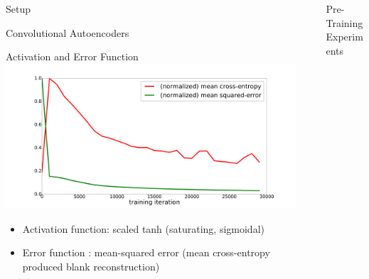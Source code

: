 \documentclass[final]{beamer}
\newlength{\sepwid}
\newlength{\onecolwid}
\newlength{\threecolwid}
\begin{document}
\begin{frame}[t]
\begin{columns}[t]
\begin{column}{\onecolwid}
\begin{alertblock}{Setup}
\begin{block}{Convolutional Autoencoders}
\end{block}

\begin{block}{Activation and Error Function}
	\centering
	\includegraphics[width=.7\linewidth]{graphics/mse_ce_comparison.png}

	\begin{itemize}
		\item Activation function: scaled tanh (saturating, sigmoidal)
		\item Error function     : mean-squared error (mean cross-entropy produced blank reconstruction)
	\end{itemize}

\end{block}


\end{alertblock}


\end{column} %


\begin{column}{\sepwid}\end{column} %


\begin{column}{\threecolwid}


\begin{alertblock}{Pre-Training Experiments}

\centering

\begin{columns}[t, totalwidth=0.9\threecolwid] %





\end{columns}
\end{alertblock}
\end{column}
\end{columns}
\end{frame}
\end{document}
